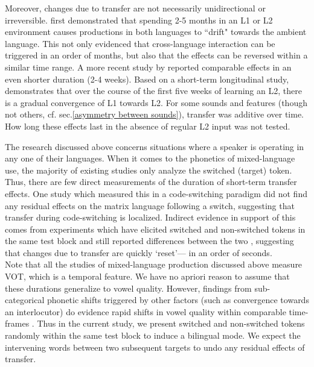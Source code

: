 \documentclass[12 pt]{article}
\begin{document}
Moreover, changes due to transfer are not necessarily unidirectional or irreversible. \cite[][VOT]{sancier1997gestural} first demonstrated that spending 2-5 months in an L1 or L2 environment causes productions in both languages to ``drift" towards the ambient language. This not only evidenced that cross-language interaction can be triggered in an order of months, but also that the effects can be reversed within a similar time range. A more recent study by \cite[][VOT]{tobin2017phonetic} reported comparable effects in an even shorter duration (2-4 weeks). Based on a short-term longitudinal study, \cite[][VOT]{chang2012rapid} demonstrates that over the course of the first five weeks of learning an L2, there is a gradual convergence of L1 towards L2. For some sounds and features (though not others, cf. sec.\ref{asymmetry between sounds}), transfer was additive over time. How long these effects last in the absence of regular L2 input was not tested. 

The research discussed above concerns situations where a speaker is operating in any one of their languages. When it comes to the phonetics of mixed-language use, the majority of existing studies only analyze the switched (target) token. Thus, there are few direct measurements of the duration of short-term transfer effects. One study which measured this in a code-switching paradigm \citep[][VOT]{bullock2009trying} did not find any residual effects on the matrix language following a switch, suggesting that transfer during code-switching is localized. Indirect evidence in support of this comes from experiments which have elicited switched and non-switched tokens in the same test block and still reported differences between the two \citep[e.g.][VOT]{tsui2019impact,olson2013bilingual}, suggesting that changes due to transfer are quickly `reset'--- in an order of seconds.\\
Note that all the studies of mixed-language production discussed above measure VOT, which is a temporal feature. We have no apriori reason to assume that these durations generalize to vowel quality. However, findings from sub-categorical phonetic shifts triggered by other factors (such as convergence towards an interlocutor) do evidence rapid shifts in vowel quality within comparable time-frames \citep[e.g.][]{pardo2010expressing,babel2010dialect,babel2012evidence}. Thus in the current study, we present switched and non-switched tokens randomly within the same test block to induce a bilingual mode. We expect the intervening words between two subsequent targets to undo any residual effects of transfer.
\end{document}

